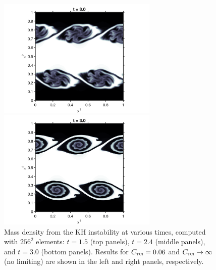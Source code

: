 \documentclass[letterpaper]{jpconf}
\newcommand{\TCI}{\textnormal{\tiny\textsc{TCI}}}
\begin{document}
\begin{figure}[h]
\begin{minipage}{18pc}
    \includegraphics[width=18pc]{./Figures/KelvinHelmholtz_30_Astronum_2018}
  \end{minipage}\hspace{0.5pc}
  \begin{minipage}{18pc}
    \includegraphics[width=18pc]{./Figures/KelvinHelmholtz_30_noLim_Astronum_2018}
  \end{minipage}
  \caption{\label{fig:KelvinHelmholtz}Mass density from the KH instability at various times, computed with $256^{2}$ elements: $t=1.5$ (top panels), $t=2.4$ (middle panels), and $t=3.0$ (bottom panels).  Results for $C_{\TCI}=0.06$ and $C_{\TCI}\to\infty$ (no limiting) are shown in the left and right panels, respectively.}
\end{figure}
\end{document}
